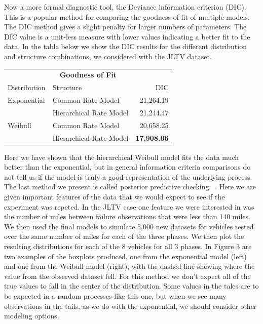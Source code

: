 \documentclass[12pt]{article}
\begin{document}
Now a more formal diagnostic tool, the Deviance information criterion (DIC).
This is a popular method for comparing the goodness of fit of multiple models.
The DIC method gives a slight penalty for larger numbers of parameters.  The DIC
value is a unit-less measure with lower values indicating a better fit to the
data.  In the table below we show the DIC results for the different distribution
and structure combinations, we considered with the JLTV dataset.

\begin{table}[h]
\centering
\begin{tabular}{|l|l|r|}
\multicolumn{3}{c}{\textbf{Goodness of Fit}} \\
\cline{1-3}
Distribution    & Structure & DIC \\
\hline
Exponential   & Common Rate Model                     & 21,264.19             \\
              & Hierarchical Rate Model               & 21,244.47             \\
Weibull       & Common Rate Model                     & 20,658.25             \\
              & Hierarchical Rate Model               & \textbf{17,908.06}    \\
\hline
\end{tabular}
\end{table}

Here we have shown that the hierarchical Weibull model fits the data much better
than the exponential, but in general information criteria comparisons do not
tell us if the model is truly a good representation of the underlying process.
The last method we present is called posterior predictive checking ~\cite{ref4}.
Here we are given important features of the data that we would expect to see if
the experiment was repeted.  In the JLTV case one feature we were interested in
was the number of miles between failure observations that were less than 140
miles.  We then used the final models to simulate 5,000 new datasets for
vehicles tested over the same number of miles for each of the three phases. We
then plot the resulting distributions for each of the 8 vehicles for all 3
phases.  In Figure 3 are two examples of the boxplots produced, one from the
exponential model (left) and one from the Weibull model (right), with the dashed
line showing where the value from the observed dataset fell.  For this method we
don’t expect all of the true values to fall in the center of the distribution.
Some values in the tales are to be expected in a random processes like this one,
but when we see many observations in the tails, as we do with the exponential,
we should consider other modeling options.
\end{document}
